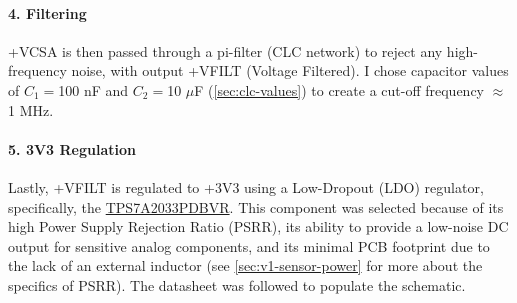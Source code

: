 \paragraph{4. Filtering}
+VCSA is then passed through a pi-filter (CLC network) to reject any high-frequency noise, with output +VFILT (Voltage Filtered). I chose capacitor values of $C_1=$100 nF and $C_2=$10 $\mu$F (\autoref{sec:clc-values}) to create a cut-off frequency $\approx$1 MHz.

\paragraph{5. 3V3 Regulation}
Lastly, +VFILT is regulated to +3V3 using a Low-Dropout (LDO) regulator, specifically, the \href{https://au.mouser.com/ProductDetail/Texas-Instruments/TPS7A2033PDBVR?qs=hd1VzrDQEGjk%2FOBnRfKB4A%3D%3D}{TPS7A2033PDBVR}. This component was selected because of its high Power Supply Rejection Ratio (PSRR), its ability to provide a low-noise DC output for sensitive analog components, and its minimal PCB footprint due to the lack of an external inductor (see \autoref{sec:v1-sensor-power} for more about the specifics of PSRR). The datasheet was followed to populate the schematic.